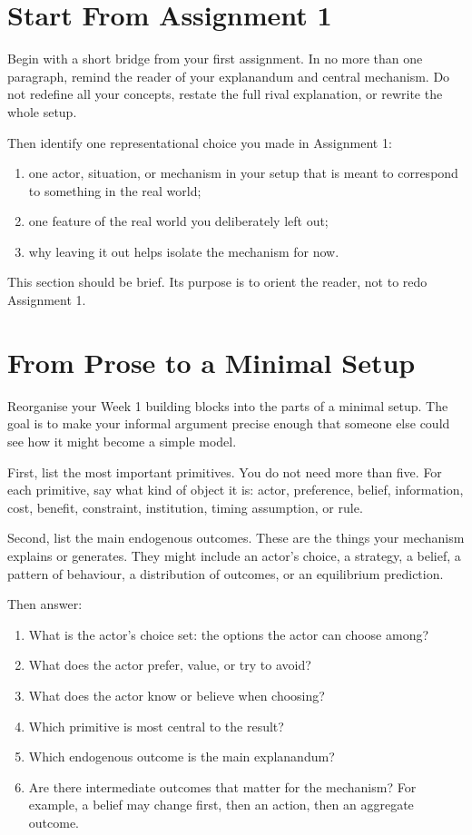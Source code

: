 \documentclass[12pt]{article}
\begin{document}
\section{Start From Assignment 1}

Begin with a short bridge from your first assignment. In no more than one paragraph, remind the reader of your explanandum and central mechanism. Do not redefine all your concepts, restate the full rival explanation, or rewrite the whole setup.

Then identify one representational choice you made in Assignment 1:
\begin{enumerate}[label=(\alph*)]
\item one actor, situation, or mechanism in your setup that is meant to correspond to something in the real world;
\item one feature of the real world you deliberately left out;
\item why leaving it out helps isolate the mechanism for now.
\end{enumerate}

This section should be brief. Its purpose is to orient the reader, not to redo Assignment 1.

\section{From Prose to a Minimal Setup}

Reorganise your Week 1 building blocks into the parts of a minimal setup. The goal is to make your informal argument precise enough that someone else could see how it might become a simple model.

First, list the most important primitives. You do not need more than five. For each primitive, say what kind of object it is: actor, preference, belief, information, cost, benefit, constraint, institution, timing assumption, or rule.

Second, list the main endogenous outcomes. These are the things your mechanism explains or generates. They might include an actor's choice, a strategy, a belief, a pattern of behaviour, a distribution of outcomes, or an equilibrium prediction.

Then answer:
\begin{enumerate}[label=(\alph*)]
\item What is the actor's choice set: the options the actor can choose among?
\item What does the actor prefer, value, or try to avoid?
\item What does the actor know or believe when choosing?
\item Which primitive is most central to the result?
\item Which endogenous outcome is the main explanandum?
\item Are there intermediate outcomes that matter for the mechanism? For example, a belief may change first, then an action, then an aggregate outcome.
\end{enumerate}
\end{document}
